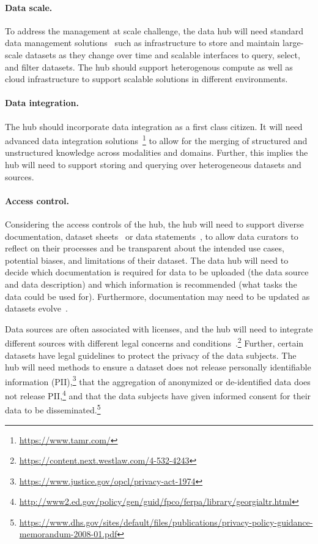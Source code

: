 \paragraph{Data scale.} To address the management at scale challenge, the data hub will need standard data management solutions~\citep{armbrust2009above} such as infrastructure to store and maintain large-scale datasets as they change over time and scalable interfaces to query, select, and filter datasets. The hub should support heterogenous compute as well as cloud infrastructure to support scalable solutions in different environments. 

\paragraph{Data integration.}
The hub should incorporate data integration as a first class citizen. It will need advanced data integration solutions~\citep{Stonebraker2018dataintegration, abiteboul1997semistructureddata, dong2020multi, rekatsinas2017holoclean}\footnote{\url{https://www.tamr.com/}} to allow for the merging of structured and unstructured knowledge across modalities and domains. Further, this implies the hub will need to support storing and querying over heterogeneous datasets and sources.

\paragraph{Access control.} Considering the access controls of the hub, the hub will need to support diverse documentation, \eg dataset sheets~\citep{gebru2018datasheets} or data statements~\citep{bender2018data}, to allow data curators to reflect on their processes and be transparent about the intended use cases, potential biases, and limitations of their dataset. The data hub will need to decide which documentation is required for data to be uploaded (\eg the data source and data description) and which information is recommended (\eg what tasks the data could be used for). Furthermore, documentation may need to be updated as datasets evolve~\citep{goel2021robustnessgym}.

Data sources are often associated with licenses, and the hub will need to integrate different sources with different legal concerns and conditions~\citep{masur2018datalicensing}.\footnote{\url{https://content.next.westlaw.com/4-532-4243}} Further, certain datasets have legal guidelines to protect the privacy of the data subjects. The hub will need methods to ensure a dataset does not release personally identifiable information (PII),\footnote{\url{https://www.justice.gov/opcl/privacy-act-1974}} that the aggregation of anonymized or de-identified data does not release PII,\footnote{\url{http://www2.ed.gov/policy/gen/guid/fpco/ferpa/library/georgialtr.html}} and that the data subjects have given informed consent for their data to be disseminated.\footnote{\url{https://www.dhs.gov/sites/default/files/publications/privacy-policy-guidance-memorandum-2008-01.pdf}}


